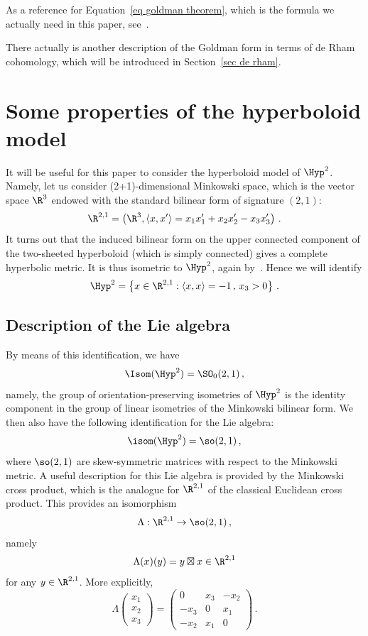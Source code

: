 As a reference for Equation~\eqref{eq goldman theorem}, which is the formula we actually need in this paper, see~\cite[Section~2]{bricegt}.

There actually is another description of the Goldman form in terms of de Rham cohomology, which will be introduced in Section~\ref{sec de rham}.



\section{Some properties of the hyperboloid model} \label{sec hyperboloid}
It will be useful for this paper to consider the hyperboloid model of $\Hyp^2$. Namely, let us consider (2+1)-dimensional Minkowski space, which is the vector space $\R^3$ endowed with the standard bilinear form of signature $(2,1)$:
\[
\R^{2,1}=\left(\R^3,\langle x,x'\rangle=x_1x_1'+x_2x_2'-x_3x_3'\right)\,.
\]
It turns out that the induced bilinear form on the upper connected component of the two-sheeted hyperboloid (which is simply connected) gives a complete hyperbolic metric. It is thus isometric to $\Hyp^2$, again by~\cite[Theorem~8.6.2]{opac-b1124711}. Hence we will identify
\[
\Hyp^2=\left\{x\in\R^{2,1}:\langle x,x\rangle=-1\,,\,x_3>0\right\}\,.
\]

\subsection{Description of the Lie algebra}

By means of this identification, we have
\[
\Isom(\Hyp^2)=\SO_0(2,1)\,,
\]
namely, the group of orientation-preserving isometries of $\Hyp^2$ is the identity component in the group of linear isometries of the Minkowski bilinear form. We then also have the following identification for the Lie algebra:
\[
\isom(\Hyp^2)=\so(2,1)\,,
\]
where $\so(2,1)$ are skew-symmetric matrices with respect to the Minkowski metric. A useful description for this Lie algebra is provided by the Minkowski cross product, which is the analogue for $\R^{2,1}$ of the classical Euclidean cross product. This provides an isomorphism
\[
\Lambda:\R^{2,1}\to \so(2,1)\,,
\]
namely
\[
\Lambda(x)(y)=y\boxtimes x\in\R^{2,1}
\]
for any $y\in\R^{2,1}$. More explicitly,
\[
\Lambda
\begin{pmatrix} x_1 \\ x_2 \\ x_3
\end{pmatrix}=
\begin{pmatrix} 0 & x_3 & -x_2 \\ -x_3 & 0 & x_1 \\ -x_2 & x_1 & 0
\end{pmatrix}\,.
\]

